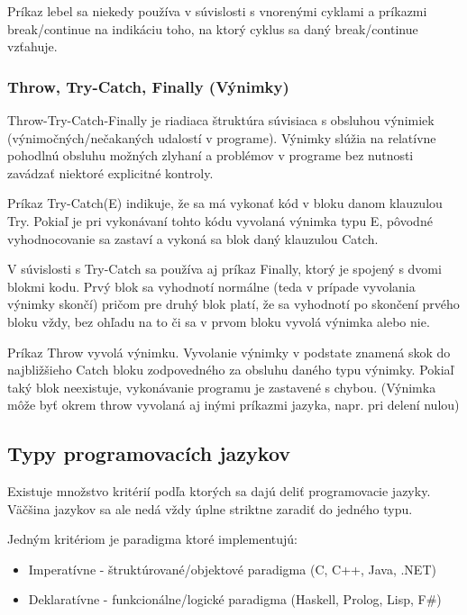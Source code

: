 \documentclass[a4paper,10pt]{article}
\begin{document}
\begin{multicols}{2}
		Príkaz lebel sa niekedy používa v súvislosti s vnorenými cyklami a príkazmi break/continue na indikáciu toho, na ktorý cyklus sa daný break/continue vzťahuje. 

	\subsubsection{Throw, Try-Catch, Finally (Výnimky)}
	
		Throw-Try-Catch-Finally je riadiaca štruktúra súvisiaca s obsluhou výnimiek (výnimočných/nečakaných udalostí v programe). Výnimky slúžia na relatívne pohodlnú obsluhu možných zlyhaní a problémov v programe bez nutnosti zavádzať niektoré explicitné kontroly.

		Príkaz Try-Catch(E) indikuje, že sa má vykonať kód v bloku danom klauzulou Try. Pokiaľ je pri vykonávaní tohto kódu vyvolaná výnimka typu E, pôvodné vyhodnocovanie sa zastaví a vykoná sa blok daný klauzulou Catch. 
		
		V súvislosti s Try-Catch sa používa aj príkaz Finally, ktorý je spojený s dvomi blokmi kodu. Prvý blok sa vyhodnotí normálne (teda v prípade vyvolania výnimky skončí) pričom pre druhý blok platí, že sa vyhodnotí po skončení prvého bloku vždy, bez ohľadu na to či sa v prvom bloku vyvolá výnimka alebo nie.
				
		Príkaz Throw vyvolá výnimku. Vyvolanie výnimky v podstate znamená skok do najbližšieho Catch bloku zodpovedného za obsluhu daného typu výnimky. Pokiaľ taký blok neexistuje, vykonávanie programu je zastavené s chybou. (Výnimka môže byť okrem throw vyvolaná aj inými príkazmi jazyka, napr. pri delení nulou)		
		
\subsection{Typy programovacích jazykov}

	Existuje množstvo kritérií podľa ktorých sa dajú deliť programovacie jazyky. Väčšina jazykov sa ale nedá vždy úplne striktne zaradiť do jedného typu.
	
	Jedným kritériom je paradigma ktoré implementujú:
	
	\begin{itemize}
		\item Imperatívne - štruktúrované/objektové paradigma (C, C++, Java, .NET)
		\item Deklaratívne - funkcionálne/logické paradigma (Haskell, Prolog, Lisp, F\#)
	\end{itemize}
	

\end{multicols}
\end{document}
